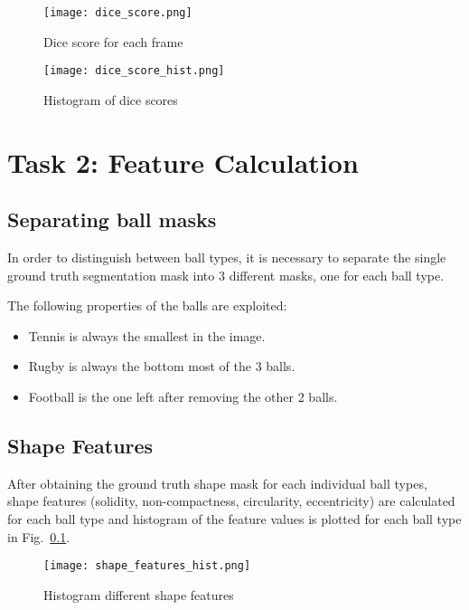\documentclass{report}
\begin{document}
\begin{figure}
    \centering
    \texttt{[image: dice\_score.png]}
    \caption{Dice score for each frame}
    \label{fig:dice_score}
\end{figure}

\begin{figure}
    \centering
    \texttt{[image: dice\_score\_hist.png]}
    \caption{Histogram of dice scores}
    \label{fig:dice_score_hist}
\end{figure}

\chapter*{Task 2: Feature Calculation}

\section{Separating ball masks}

In order to distinguish between ball types, it is necessary to separate the single ground truth segmentation mask into 3 different masks, one for each ball type.

The following properties of the balls are exploited:

\begin{itemize}
    \item Tennis is always the smallest in the image.
    \item Rugby is always the bottom most of the 3 balls.
    \item Football is the one left after removing the other 2 balls.
\end{itemize}

\section{Shape Features}

After obtaining the ground truth shape mask for each individual ball types, shape features (solidity, non-compactness, circularity, eccentricity) are calculated for each ball type and histogram of the feature values is plotted for each ball type in Fig.~\ref{fig:shape_features_hist}.

\begin{figure}
    \centering
    \texttt{[image: shape\_features\_hist.png]}
    \caption{Histogram different shape features}
    \label{fig:shape_features_hist}
\end{figure}
\end{document}
